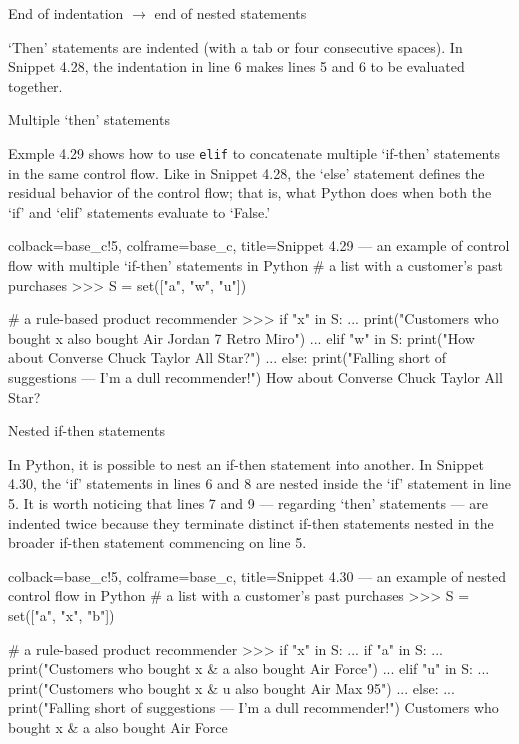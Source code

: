 \documentclass[a4paper,11pt]{book}
\numberwithin{figure}{chapter}
\numberwithin{table}{chapter}
\newcommand{\question}[1]{%
    \begin{tcolorbox}[colback=comp_c!10,colframe=comp_c,sidebyside align=top,width=\linewidth,before skip=1ex]
        #1
    \end{tcolorbox}
    \switchcolumn%
}
\newcommand{\note}[1]{%
    \begin{tcolorbox}[colback=white!0,colframe=white!10,width=\linewidth,before skip=1ex]
        #1
    \end{tcolorbox}
}
\begin{document}
\begin{paracol}{2}
	\question{\raggedright End of indentation $\rightarrow$ end of nested statements}
	\note{`Then' statements are indented (with a tab or four consecutive spaces). In Snippet 4.28, the indentation in line 6 makes lines 5 and 6 to be evaluated together.}
\end{paracol}

\begin{paracol}{2}
\question{\raggedright Multiple `then' statements}
\note{Exmple 4.29 shows how to use \texttt{elif} to concatenate multiple `if-then' statements in the same control flow. Like in Snippet 4.28, the `else' statement defines the residual behavior of the control flow; that is, what Python does when both the `if' and `elif' statements evaluate to `False.'}
\end{paracol}

\begin{pythoncode}[linenos=true,]{colback=base_c!5, colframe=base_c, title=\sffamily Snippet 4.29 --- an example of control flow with multiple `if-then' statements in Python}
# a list with a customer's past purchases
>>> S = set(["a", "w", "u"])

# a rule-based product recommender 
>>> if "x" in S:
...     print("Customers who bought x also bought Air Jordan 7 Retro Miro")
... elif "w" in S:
	print("How about Converse Chuck Taylor All Star?")
... else:
	print("Falling short of suggestions --- I'm a dull recommender!")
How about Converse Chuck Taylor All Star?
\end{pythoncode}

\begin{paracol}{2}
\question{\raggedright Nested if-then statements}
\note{In Python, it is possible to nest an if-then statement into another. In Snippet 4.30, the `if' statements in lines 6 and 8 are nested inside the `if' statement in line 5. It is worth noticing that lines 7 and 9 --- regarding `then' statements --- are indented twice because they terminate distinct if-then statements nested in the broader if-then statement commencing on line 5.}
\end{paracol}

\begin{pythoncode}[linenos=true,]{colback=base_c!5, colframe=base_c, title=\sffamily Snippet 4.30 --- an example of nested control flow in Python}
# a list with a customer's past purchases
>>> S = set(["a", "x", "b"])

# a rule-based product recommender 
>>> if "x" in S:
...     if "a" in S:
...         print("Customers who bought x & a also bought Air Force")
...     elif "u" in S:
...         print("Customers who bought x & u also bought Air Max 95")
... else:
...    print("Falling short of suggestions --- I'm a dull recommender!") 
Customers who bought x & a also bought Air Force
\end{pythoncode}
\end{document}
